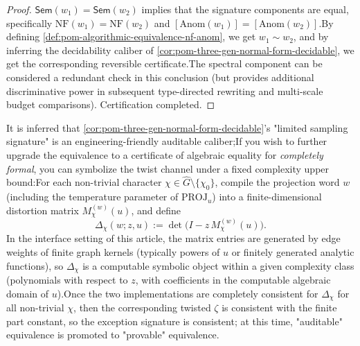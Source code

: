 \begin{proof}
\(\mathsf{Sem}(w_1)=\mathsf{Sem}(w_2)\) implies that the signature components are equal, specifically \(\mathrm{NF}(w_1)=\mathrm{NF}(w_2)\) and \([\mathrm{Anom}(w_1)]=[\mathrm{Anom}(w_2)]\).By defining \ref{def:pom-algorithmic-equivalence-nf-anom}, we get \(w_1\sim w_2\), and by inferring the decidability caliber of \ref{cor:pom-three-gen-normal-form-decidable}, we get the corresponding reversible certificate.The spectral component can be considered a redundant check in this conclusion (but provides additional discriminative power in subsequent type-directed rewriting and multi-scale budget comparisons). Certification completed.\end{proof}

\begin{remark}\label{rem:pom-anom-symbolic-certificate}It is inferred that \ref{cor:pom-three-gen-normal-form-decidable}'s "limited sampling signature" is an engineering-friendly auditable caliber;If you wish to further upgrade the equivalence to a certificate of algebraic equality for \emph {completely formal}, you can symbolize the twist channel under a fixed complexity upper bound:For each non-trivial character \(\chi\in\widehat G\setminus\{\chi_0\}\), compile the projection word \(w\) (including the temperature parameter of \(\mathrm{PROJ}_u\)) into a finite-dimensional distortion matrix \(M_{\chi}^{(w)}(u)\), and define\[
\Delta_\chi(w;z,u):=\det\bigl(I-z\,M_{\chi}^{(w)}(u)\bigr).
\]
In the interface setting of this article, the matrix entries are generated by edge weights of finite graph kernels (typically powers of \(u\) or finitely generated analytic functions), so \(\Delta_\chi\) is a computable symbolic object within a given complexity class (polynomials with respect to \(z\), with coefficients in the computable algebraic domain of \(u\)).Once the two implementations are completely consistent for \(\Delta_\chi\) for all non-trivial \(\chi\), then the corresponding twisted \(\zeta\) is consistent with the finite part constant, so the exception signature is consistent; at this time, "auditable" equivalence is promoted to "provable" equivalence.\end{remark}

